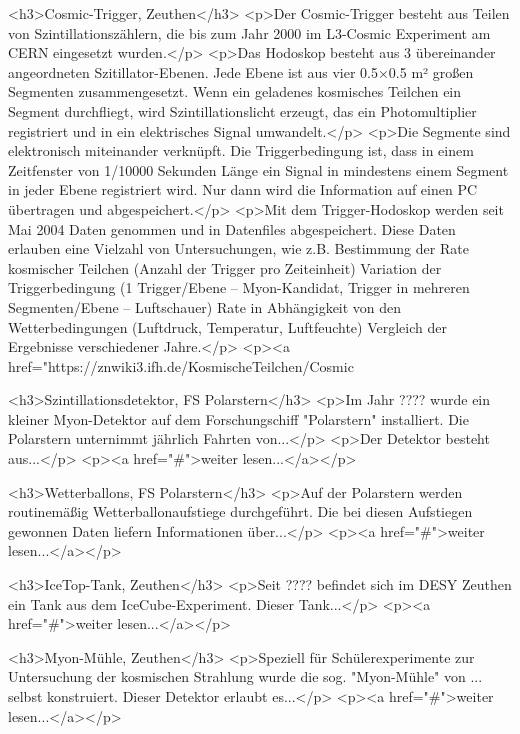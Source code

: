 \documentclass[version=last,
	a4paper,			%
	pagesize, 			%
	11pt,				%
	BCOR1cm,			%
	DIV12,	 			%
	pointlessnumbers,   %
	halfparskip,		%
]{scrreprt}
\begin{document}
				<h3>Cosmic-Trigger, Zeuthen</h3>
					<p>Der Cosmic-Trigger besteht aus Teilen von Szintillationszählern, die bis zum Jahr 2000 im L3-Cosmic Experiment am CERN eingesetzt wurden.</p>
		            <p>Das Hodoskop besteht aus 3 übereinander angeordneten Szitillator-Ebenen. Jede Ebene ist aus vier 0.5×0.5 m² großen Segmenten zusammengesetzt.
		            Wenn ein geladenes kosmisches Teilchen ein Segment durchfliegt, wird Szintillationslicht erzeugt, das ein Photomultiplier registriert und in ein
		            elektrisches Signal umwandelt.</p>
		            <p>Die Segmente sind elektronisch miteinander verknüpft. Die Triggerbedingung ist, dass in einem Zeitfenster von 1/10000 Sekunden Länge ein Signal
		            in mindestens einem Segment in jeder Ebene registriert wird. Nur dann wird die Information auf einen PC übertragen und abgespeichert.</p>
		            <p>Mit dem Trigger-Hodoskop werden seit Mai 2004 Daten genommen und in Datenfiles abgespeichert. Diese Daten erlauben eine Vielzahl von Untersuchungen, wie z.B.
		            Bestimmung der Rate kosmischer Teilchen  (Anzahl der Trigger pro Zeiteinheit)    Variation der Triggerbedingung    (1 Trigger/Ebene – Myon-Kandidat, Trigger in mehreren Segmenten/Ebene – Luftschauer)
		            Rate in Abhängigkeit von den Wetterbedingungen    (Luftdruck, Temperatur, Luftfeuchte)    Vergleich der Ergebnisse verschiedener Jahre.</p>
		            <p><a href="https://znwiki3.ifh.de/KosmischeTeilchen/Cosmic%
		
		        <h3>Szintillationsdetektor, FS Polarstern</h3>
		            <p>Im Jahr ???? wurde ein kleiner Myon-Detektor auf dem Forschungschiff "Polarstern" installiert. Die Polarstern unternimmt jährlich Fahrten von...</p>
		            <p>Der Detektor besteht aus...</p>
		            <p><a href="#">weiter lesen...</a></p>

                <h3>Wetterballons, FS Polarstern</h3>
                    <p>Auf der Polarstern werden routinemäßig Wetterballonaufstiege durchgeführt. Die bei diesen Aufstiegen gewonnen Daten liefern Informationen über...</p>
                    <p><a href="#">weiter lesen...</a></p>

                <h3>IceTop-Tank, Zeuthen</h3>
                    <p>Seit ???? befindet sich im DESY Zeuthen ein Tank aus dem IceCube-Experiment. Dieser Tank...</p>
                    <p><a href="#">weiter lesen...</a></p>

                <h3>Myon-Mühle, Zeuthen</h3>
                    <p>Speziell für Schülerexperimente zur Untersuchung der kosmischen Strahlung wurde die sog. "Myon-Mühle" von ... selbst konstruiert. Dieser Detektor erlaubt es...</p>
                    <p><a href="#">weiter lesen...</a></p>
\end{document}
